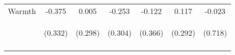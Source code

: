 \begin{tabular}{lcccccc}
\noalign{\smallskip}Warmth & -0.375 & 0.005 & -0.253 & -0.122 & 0.117 & -0.023\\
 & \begin{footnotesize}(0.332)\end{footnotesize} & \begin{footnotesize}(0.298)\end{footnotesize} & \begin{footnotesize}(0.304)\end{footnotesize} & \begin{footnotesize}(0.366)\end{footnotesize} & \begin{footnotesize}(0.292)\end{footnotesize} & \begin{footnotesize}(0.718)\end{footnotesize}\\
\noalign{\smallskip}\hline\end{tabular}\\
